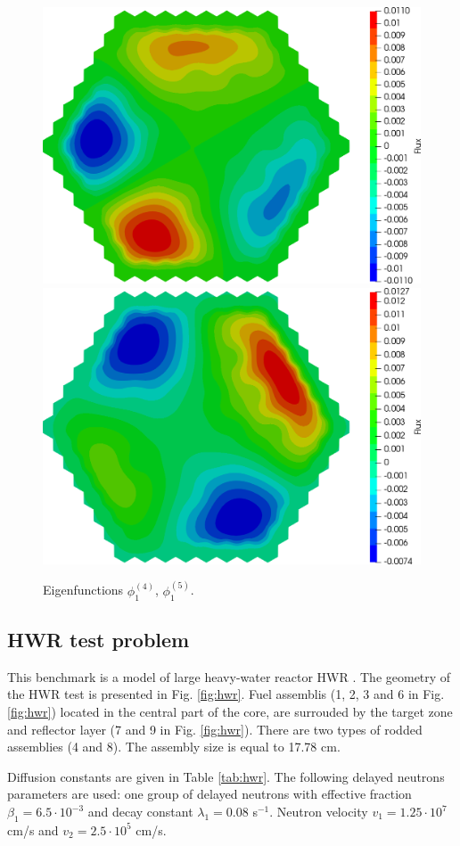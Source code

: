 \documentclass[authoryear]{elsarticle}
\begin{document}
\begin{figure}[H]
\begin{center}
	\includegraphics[width=0.49\linewidth]{iaea_cosym/sp3_alpha_u1_4_assym.png}
	\includegraphics[width=0.49\linewidth]{iaea_cosym/sp3_alpha_u1_5_assym.png}\\
	\caption{Eigenfunctions $\phi_1^{(4)}$, $\phi_1^{(5)}$.}
	\label{fig:iaea_cosym_fun_3}
\end{center}
\end{figure}

\subsection{HWR test problem}
This benchmark is a model of large heavy-water reactor HWR \citep{chao1995}. 
The geometry of the HWR test is presented in Fig. \ref{fig:hwr}. Fuel assemblis (1, 2, 3 and 6 in Fig. \ref{fig:hwr}) located in the central part of the core, are surrouded by the target zone and reflector layer (7 and 9 in Fig. \ref{fig:hwr}). There are two types of rodded assemblies (4 and 8).
The assembly size is equal to 17.78 cm. 

Diffusion constants  are given in Table \ref{tab:hwr}. 
The following delayed neutrons parameters are used: one group of delayed neutrons with effective fraction $\beta_1 = 6.5\cdot10^{-3}$ and decay constant $\lambda_1 = 0.08$ s$^{-1}$. 
Neutron velocity  $v_1 = 1.25 \cdot 10^7$ cm/s and $v_2 = 2.5 \cdot 10^5$ cm/s.
\end{document}
